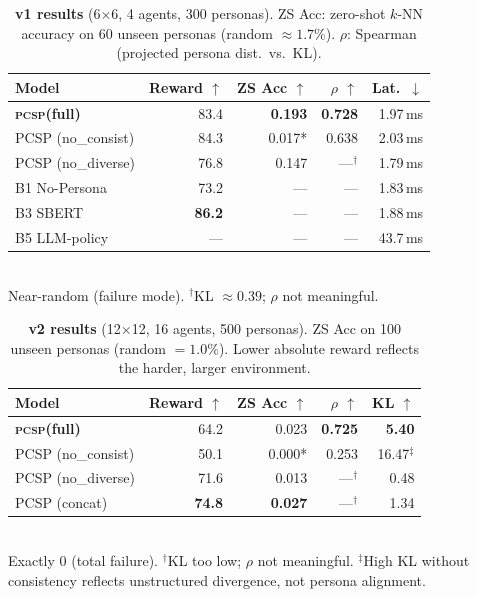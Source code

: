 \documentclass[conference]{IEEEtran}
\newcommand{\PCSP}{\textsc{pcsp}\xspace}
\begin{document}
\begin{table}[t]
  \centering
  \small
  \caption{%
    \textbf{v1 results} (6$\times$6, 4 agents, 300 personas).
    ZS Acc: zero-shot $k$-NN accuracy on 60 unseen personas
    (random $\approx\!1.7\%$). $\rho$: Spearman (projected persona dist.\ vs.\ KL).}
  \label{tab:results_v1}
  \setlength{\tabcolsep}{3pt}
  \begin{tabular}{lrrrr}
    \toprule
    Model & Reward $\uparrow$ & ZS Acc $\uparrow$ & $\rho$ $\uparrow$ & Lat.\ $\downarrow$ \\
    \midrule
    \textbf{\PCSP (full)}  & 83.4 & \textbf{0.193} & \textbf{0.728} & 1.97\,ms \\
    PCSP (no\_consist)     & 84.3 & 0.017*  & 0.638 & 2.03\,ms \\
    PCSP (no\_diverse)     & 76.8 & 0.147   & ---$^\dagger$ & 1.79\,ms \\
    B1 No-Persona          & 73.2 & ---     & ---   & 1.83\,ms \\
    B3 SBERT               & \textbf{86.2} & --- & --- & 1.88\,ms \\
    B5 LLM-policy          & ---  & ---     & ---   & 43.7\,ms \\
    \bottomrule
  \end{tabular}\\[2pt]
  {\footnotesize * Near-random (failure mode).
    $^\dagger$KL $\approx\!0.39$; $\rho$ not meaningful.}
\end{table}

\begin{table}[t]
  \centering
  \small
  \caption{%
    \textbf{v2 results} (12$\times$12, 16 agents, 500 personas).
    ZS Acc on 100 unseen personas (random $=\!1.0\%$).
    Lower absolute reward reflects the harder, larger environment.}
  \label{tab:results_v2}
  \setlength{\tabcolsep}{3pt}
  \begin{tabular}{lrrrr}
    \toprule
    Model & Reward $\uparrow$ & ZS Acc $\uparrow$ & $\rho$ $\uparrow$ & KL $\uparrow$ \\
    \midrule
    \textbf{\PCSP (full)}  & 64.2 & 0.023 & \textbf{0.725} & \textbf{5.40} \\
    PCSP (no\_consist)     & 50.1 & 0.000*  & 0.253 & 16.47$^\ddagger$ \\
    PCSP (no\_diverse)     & 71.6 & 0.013   & ---$^\dagger$ & 0.48 \\
    PCSP (concat)          & \textbf{74.8} & \textbf{0.027} & ---$^\dagger$ & 1.34 \\
    \bottomrule
  \end{tabular}\\[2pt]
  {\footnotesize * Exactly 0 (total failure). $^\dagger$KL too low; $\rho$ not meaningful.
    $^\ddagger$High KL without consistency reflects unstructured divergence, not persona alignment.}
\end{table}
\end{document}
